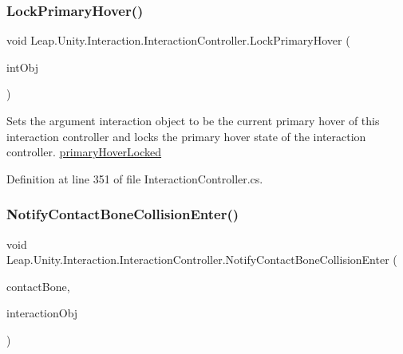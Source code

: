 \subsubsection{\texorpdfstring{LockPrimaryHover()}{LockPrimaryHover()}}
{\footnotesize\ttfamily void Leap.\+Unity.\+Interaction.\+Interaction\+Controller.\+Lock\+Primary\+Hover (\begin{DoxyParamCaption}\item[{\mbox{\hyperlink{class_leap_1_1_unity_1_1_interaction_1_1_interaction_behaviour}{Interaction\+Behaviour}}}]{int\+Obj }\end{DoxyParamCaption})}



Sets the argument interaction object to be the current primary hover of this interaction controller and locks the primary hover state of the interaction controller. \mbox{\hyperlink{class_leap_1_1_unity_1_1_interaction_1_1_interaction_controller_afa44de31d034ff2bceb41ee6a20d0253}{primary\+Hover\+Locked}} 



Definition at line 351 of file Interaction\+Controller.\+cs.

\mbox{\label{class_leap_1_1_unity_1_1_interaction_1_1_interaction_controller_a879fe5f12fdb87f95b08b50dc492fb5f}} 
\subsubsection{\texorpdfstring{NotifyContactBoneCollisionEnter()}{NotifyContactBoneCollisionEnter()}}
{\footnotesize\ttfamily void Leap.\+Unity.\+Interaction.\+Interaction\+Controller.\+Notify\+Contact\+Bone\+Collision\+Enter (\begin{DoxyParamCaption}\item[{\mbox{\hyperlink{class_leap_1_1_unity_1_1_interaction_1_1_contact_bone}{Contact\+Bone}}}]{contact\+Bone,  }\item[{\mbox{\hyperlink{interface_leap_1_1_unity_1_1_interaction_1_1_i_interaction_behaviour}{I\+Interaction\+Behaviour}}}]{interaction\+Obj }\end{DoxyParamCaption})}



